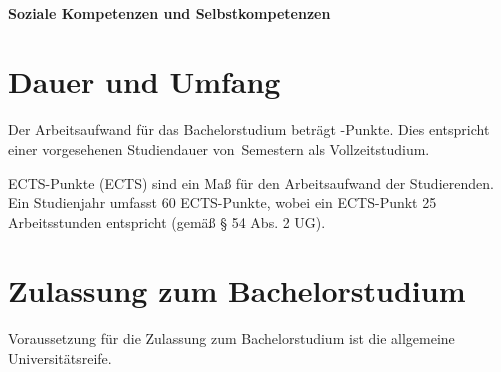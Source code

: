 \paragraph{Soziale Kompetenzen und Selbstkompetenzen}
%

%

\section{Dauer und Umfang}\label{sec:DU}

Der Arbeitsaufwand für das Bachelorstudium \emph{}
beträgt -Punkte. Dies entspricht einer vorgesehenen
Studiendauer von \,Semes\-tern als Vollzeitstudium.

ECTS-Punkte (ECTS) sind ein Maß für den Arbeitsaufwand der Studierenden.
Ein Studienjahr umfasst 60 ECTS-Punkte, wobei ein ECTS-Punkt 25
Arbeitsstunden entspricht (gemäß § 54 Abs. 2 UG).

\section{Zulassung zum Bachelorstudium}\label{sec:ZB}

Voraussetzung für die Zulassung zum Bachelorstudium \emph{}
ist die allgemeine Universitätsreife.

%
\newcommand*\Deutsch[1][B2]{%
  Für einen erfolgreichen Studienfortgang werden Deutschkenntnisse
  nach Referenzniveau #1 des Gemeinsamen Europäischen Referenzrahmens
  für Sprachen empfohlen.%
}%
\newcommand*\Englisch[1][]{}%
\newcommand*\DarstellendeGeometrie{%
  \par
  Zusätzlich ist vor vollständiger Ablegung der Bachelorprüfung gemäß
  §4 Abs.\,1 lit.\,c Universitätsberechtigungsverordnung~-- UBVO
  (BGBl.\,II Nr.\,44/1998 idgF.)~-- eine Zusatzprüfung über
  Darstellende Geometrie abzulegen, wenn die in §4 Abs.\,4 UBVO
  festgelegten Kriterien nicht erfüllt sind.%
  \par
}%

